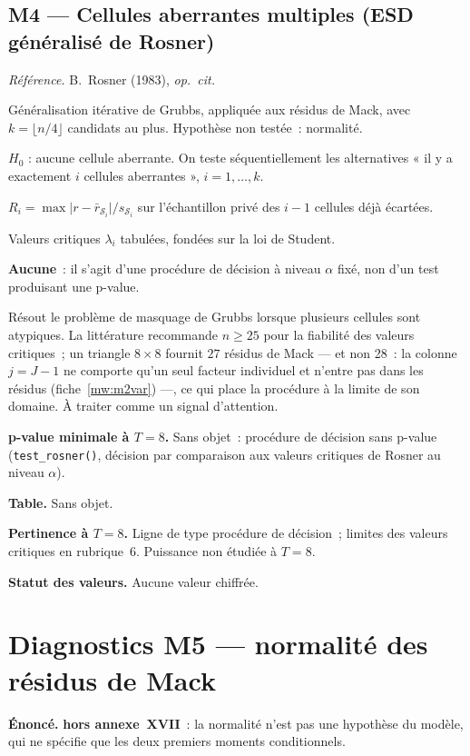 \documentclass[a4paper,11pt]{article}
\newcommand{\code}[1]{\texttt{\small #1}}
\newcommand{\refl}[1]{{\small\textcolor{maincolor!70!black}{\textit{Référence.} #1}}\par\smallskip}
\newcounter{ficheid}
\newenvironment{fiche}[1]{%
  \stepcounter{ficheid}%
  \phantomsection
  \subsection{#1}%
  \label{fiche:\theficheid}%
}{%
  \end{description}\vspace{0.5em}%
}
\newcommand{\Cadre}{%
  \begin{description}[leftmargin=0pt, style=unboxed, itemsep=3pt, topsep=3pt, parsep=2pt]%
  \item[\textcolor{financeblue}{\textbf{1. Cadre, notations et hypothèses de validité (non testées).}}]}
\newcommand{\Hzero}{\item[\textcolor{financeblue}{\textbf{2. Hypothèse nulle.}}]}
\newcommand{\Stat}{\item[\textcolor{financeblue}{\textbf{3. Statistique de test.}}]}
\newcommand{\Loi}{\item[\textcolor{financeblue}{\textbf{4. Loi sous $H_0$.}}]}
\newcommand{\Pval}{\item[\textcolor{financeblue}{\textbf{5. p-value.}}]}
\newcommand{\Usage}{\item[\textcolor{financeblue}{\textbf{6. Usage et limites.}}]}
\newcommand{\Pertinence}{\item[\textcolor{financeblue}{\textbf{7. Pertinence et puissance à faible $T$.}}]}
\begin{document}
\begin{fiche}{M4 --- Cellules aberrantes multiples (ESD généralisé de Rosner)}
\label{mw:m4ros}
\refl{B.~Rosner (1983), \emph{op.\ cit.}}
\Cadre
Généralisation itérative de Grubbs, appliquée aux résidus de Mack, avec
$k = \lfloor n/4 \rfloor$ candidats au plus. Hypothèse non testée~: normalité.
\Hzero
$H_0$ : aucune cellule aberrante. On teste séquentiellement les alternatives
« il y a exactement $i$ cellules aberrantes », $i = 1,\dots,k$.
\Stat
$R_i = \max\big|r - \bar r_{\mathcal{S}_i}\big| / s_{\mathcal{S}_i}$ sur
l'échantillon privé des $i-1$ cellules déjà écartées.
\Loi
Valeurs critiques $\lambda_i$ tabulées, fondées sur la loi de Student.
\Pval
\textbf{Aucune}~: il s'agit d'une procédure de décision à niveau $\alpha$ fixé,
non d'un test produisant une p-value.
\Usage
Résout le problème de masquage de Grubbs lorsque plusieurs cellules sont
atypiques. La littérature recommande $n \ge 25$ pour la fiabilité des valeurs
critiques~; un triangle $8\times8$ fournit $27$ résidus de Mack --- et non 28~:
la colonne $j = J-1$ ne comporte qu'un seul facteur individuel et n'entre pas
dans les résidus (fiche~\ref{mw:m2var}) ---, ce qui place la procédure à la
limite de son domaine. À traiter comme un signal d'attention.
\Pertinence
\textbf{p-value minimale à $T = 8$.} Sans objet~: procédure de décision sans p-value (\code{test\_rosner()}, décision par comparaison aux valeurs critiques de Rosner au niveau $\alpha$).

\textbf{Table.} Sans objet.

\textbf{Pertinence à $T = 8$.} Ligne de type procédure de décision~; limites des valeurs critiques en rubrique~6. Puissance non étudiée à $T = 8$.

\textbf{Statut des valeurs.} Aucune valeur chiffrée.
\end{fiche}

\clearpage
\section{Diagnostics M5 --- normalité des résidus de Mack}
\label{sec:mwm5}

\begin{encadre}
\textbf{Énoncé.} \textbf{hors annexe~XVII}~: la normalité n'est pas une hypothèse du modèle, qui ne spécifie que les deux premiers moments conditionnels.
\end{encadre}
\end{document}
